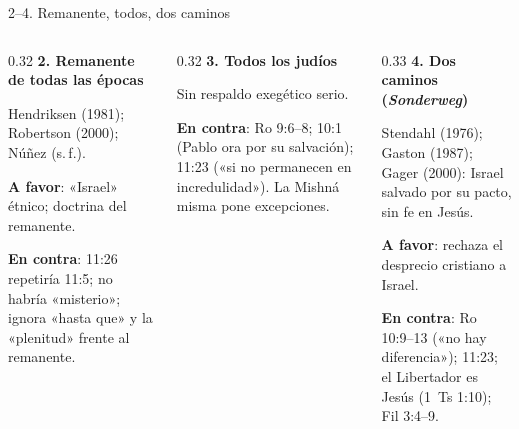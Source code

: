 \documentclass[hyperref={bookmarks=false},aspectratio=169]{beamer}
\begin{document}
\begin{frame}{2--4. Remanente, todos, dos caminos}
\begin{columns}[T,onlytextwidth]
\begin{column}{0.32\textwidth}\scriptsize\RaggedRight
\textbf{\textcolor{ladrillo}{2. Remanente de todas las épocas}}\par\smallskip
Hendriksen (1981); Robertson (2000); Núñez (s.\,f.).\par\smallskip
\textbf{A favor}: «Israel» étnico; doctrina del remanente.\par
\textbf{En contra}: 11:26 repetiría 11:5; no habría «misterio»; ignora «hasta que» y la «plenitud» frente al remanente.
\end{column}
\begin{column}{0.32\textwidth}\scriptsize\RaggedRight
\textbf{\textcolor{ladrillo}{3. Todos los judíos}}\par\smallskip
Sin respaldo exegético serio.\par\smallskip
\textbf{En contra}: Ro 9:6--8; 10:1 (Pablo ora por su salvación); 11:23 («si no permanecen en incredulidad»). La Mishná misma pone excepciones.
\end{column}
\begin{column}{0.33\textwidth}\scriptsize\RaggedRight
\textbf{\textcolor{ladrillo}{4. Dos caminos (\emph{Sonderweg})}}\par\smallskip
Stendahl (1976); Gaston (1987); Gager (2000): Israel salvado por su pacto, sin fe en Jesús.\par\smallskip
\textbf{A favor}: rechaza el desprecio cristiano a Israel.\par
\textbf{En contra}: Ro 10:9--13 («no hay diferencia»); 11:23; el Libertador es Jesús (1~Ts 1:10); Fil 3:4--9.
\end{column}
\end{columns}
\end{frame}
\end{document}
